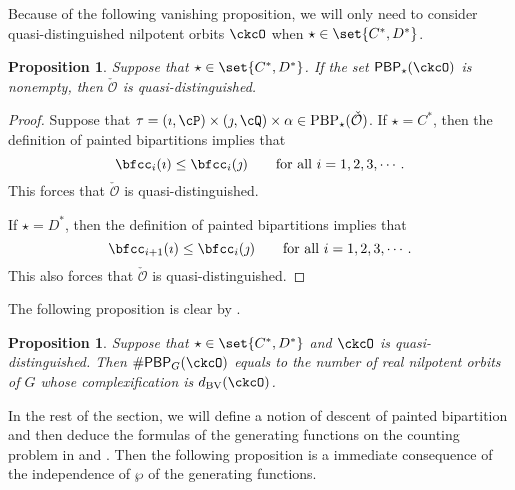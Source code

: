 \documentclass[12pt,a4paper]{amsart}
\newcommand{\CO}{{\mathcal {O}}}
\numberwithin{equation}{section}
\newtheorem{prop}[thm]{Proposition}
\theoremstyle{remark}
\def\dBV{d_{\mathrm{BV}}}
\def\PBP{\mathsf{PBP}}
\begin{document}
Because of the following vanishing proposition, we will only need to consider
quasi-distinguished nilpotent orbits $\ckcO$ when $\star\in \set{C^*, D^*}$.

\begin{prop}\label{prop:CD*}
  Suppose that $\star\in \set{C^*, D^*}$. If the set $\PBP_\star(\ckcO)$ is nonempty, then $\check \CO$ is quasi-distinguished.
\end{prop}
\begin{proof}
  Suppose that $\tau=(\imath,\cP)\times(\jmath,\cQ)\times \alpha \in  \mathrm{PBP}_\star(\check \CO)$. If  $\star=C^*$, then  the definition of painted bipartitions implies that
 \[
 \bfcc_i(\imath)\leq \bfcc_i(\jmath) \qquad \textrm{for all } i=1,2,3, \cdots.
 \]
This forces that $\check \CO$ is quasi-distinguished.

 If  $\star=D^*$, then  the definition of painted bipartitions implies that
 \[
 \bfcc_{i+1}(\imath)\leq \bfcc_i(\jmath) \qquad \textrm{for all } i=1,2,3, \cdots.
 \]
This  also forces that   $\check \CO$ is quasi-distinguished.
 \end{proof}

The following proposition is clear by .
\begin{prop}\label{prop:count.CD*}
  Suppose that $\star\in \set{C^*, D^*}$ and $\ckcO$ is quasi-distinguished.
  Then $\# \PBP_{G}(\ckcO)$ equals to the number of real nilpotent orbits of $G$
  whose complexification is $\dBV(\ckcO)$.
\end{prop}





In the rest of the section, we will define a notion of descent of painted
bipartition and then deduce the formulas of the generating functions on the
counting problem in  and . Then the following
proposition is a immediate consequence of the independence of $\wp$ of the
generating functions.

\end{document}
